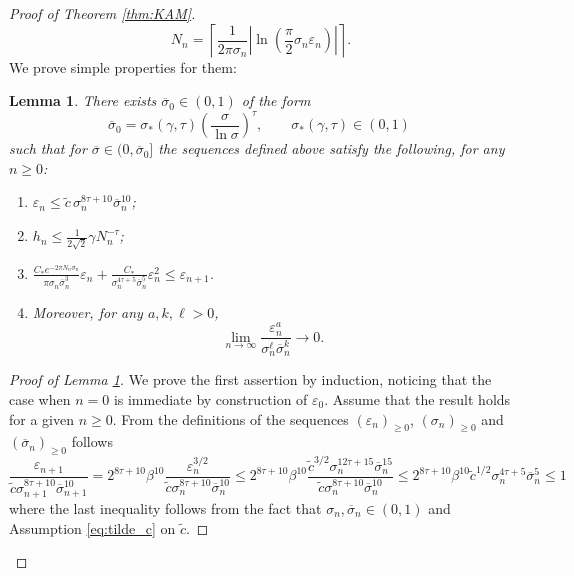 \documentclass[10pt]{article}
\newtheorem{lemma}[theorem]{Lemma}
\begin{document}
\begin{proof}[Proof of Theorem \ref{thm:KAM}]
\[
N_n = \left\lceil
\frac{1}{2\pi\sigma_n}
\left|
\ln\left(
\frac{\pi}{2}\sigma_n\varepsilon_n
\right)
\right|
\right\rceil.
\]
We prove simple properties for them:
\begin{lemma}
    \label{lemma:prop_seq_eps_N}
    There exists $\overline\sigma_0\in(0,1)$ of the form
    \[
    \overline\sigma_0 = \sigma_\ast(\gamma,\tau)
    \left(\frac{\sigma}{\ln\sigma}\right)^\tau
    ,\qquad \sigma_\ast(\gamma,\tau)\in(0,1)
    \
    \]
    such that for $\overline\sigma\in(0,\overline\sigma_0]$ the sequences defined above satisfy the following, for any $n\geq 0$:
    \begin{enumerate}
        \item $\varepsilon_n\leq \tilde c \,\sigma_n^{8\tau+10}\overline\sigma_n^{10}$;
        \item $h_n \leq \tfrac{1}{2\sqrt 2}\gamma N_n^{-\tau}$;
        \item $\frac{C_\ast e^{-2\pi N_n\sigma_n}}{\pi\sigma_n\overline\sigma_n^3}\varepsilon_n + \frac{C_\ast}{\sigma_n^{4\tau+5}\overline\sigma_n^5}\varepsilon_n^2\leq \varepsilon_{n+1}$.
        \item \label{cond:fast_decrease} Moreover, for any $a, k,\ell > 0$, 
        \[
        \lim_{n \to \infty} \frac{\varepsilon_n^a}{\sigma_n^{\ell}\overline\sigma_n^{k}} \to 0.
        \]
    \end{enumerate}
\end{lemma}

\begin{proof}[Proof of Lemma \ref{lemma:prop_seq_eps_N}]
We prove the first assertion by induction, noticing that the case when $n=0$ is immediate by construction of $\varepsilon_0$. Assume that the result holds for a given $n\geq 0$. From the definitions of the sequences $(\varepsilon_n)_{\geq 0}$, $(\sigma_n)_{\geq 0}$ and $(\overline\sigma_n)_{\geq 0}$ follows
\[
\frac{\varepsilon_{n+1}}{\tilde c\sigma_{n+1}^{8\tau+10}\overline\sigma_{n+1}^{10}}
= 
2^{8\tau+10}\beta^{10}\frac{\varepsilon_{n}^{3/2}}{\tilde c\sigma_{n}^{8\tau+10}\overline\sigma_{n}^{10}}
\leq 
2^{8\tau+10}\beta^{10} \frac{\tilde c^{3/2}\sigma_{n}^{12\tau+15}\overline\sigma_{n}^{15}}{\tilde c\sigma_{n}^{8\tau+10}\overline\sigma_{n}^{10}}
\leq 
2^{8\tau+10}\beta^{10}\tilde c^{1/2}
\sigma_{n}^{4\tau+5}\overline\sigma_{n}^{5}\leq 1
\]
where the last inequality follows from the fact that $\sigma_n,\overline\sigma_n\in(0,1)$ and Assumption \eqref{eq:tilde_c} on $\tilde c$. 


\end{proof}
\end{proof}
\end{document}
